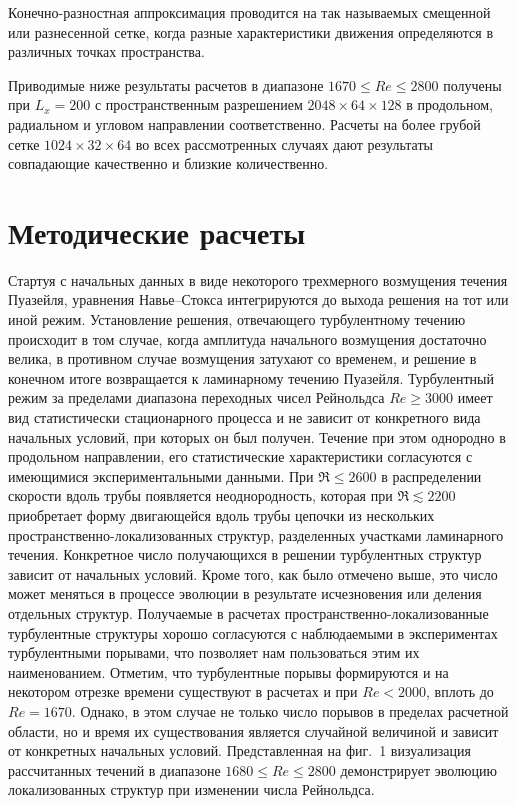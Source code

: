 Конечно-разностная аппроксимация проводится на так называемых смещенной или разнесенной сетке, когда разные характеристики движения определяются в различных точках пространства. 

Приводимые ниже результаты расчетов в диапазоне $1670\leqslant Re\leqslant 2800$ получены при $L_x=200$ с пространственным разрешением $2048 \times 64 \times 128$ в продольном, радиальном и угловом направлении соответственно. Расчеты на более грубой сетке $1024\times32\times64$ во всех рассмотренных случаях дают результаты совпадающие качественно и близкие количественно.


\section{Методические расчеты}

Стартуя с начальных данных в виде некоторого трехмерного возмущения течения Пуазейля, уравнения Навье--Стокса интегрируются до выхода решения на тот или иной режим. Установление решения, отвечающего турбулентному течению происходит в том случае, когда амплитуда начального возмущения достаточно велика, в противном случае возмущения затухают со временем, и решение в конечном итоге возвращается к ламинарному течению Пуазейля. Турбулентный режим за пределами диапазона переходных чисел Рейнольдса $Re\geqslant3000$ имеет вид статистически стационарного процесса и не зависит от конкретного вида начальных условий, при которых он был получен. Течение при этом однородно в продольном направлении, его статистические характеристики согласуются с имеющимися экспериментальными данными. При $\Re\leqslant2600$ в распределении скорости вдоль трубы появляется неоднородность, которая при $\Re\lesssim2200$ приобретает форму двигающейся вдоль трубы цепочки из нескольких пространственно-локализованных структур, разделенных участками ламинарного течения. Конкретное число получающихся в решении турбулентных структур зависит от начальных условий. Кроме того, как было отмечено выше, это число может меняться в процессе эволюции в результате исчезновения или деления отдельных структур. Получаемые в расчетах пространственно-локализованные турбулентные структуры хорошо согласуются с наблюдаемыми в экспериментах турбулентными порывами, что позволяет нам пользоваться этим их наименованием. Отметим, что турбулентные порывы формируются и на некотором отрезке времени существуют в расчетах и при $Re<2000$, вплоть до $Re=1670$. Однако, в этом случае не только число порывов в пределах расчетной области, но и время их существования является случайной величиной и зависит от конкретных начальных условий. Представленная на фиг.~1 визуализация рассчитанных течений в диапазоне $1680\leqslant Re\leqslant2800$ демонстрирует эволюцию локализованных структур при изменении числа Рейнольдса.




